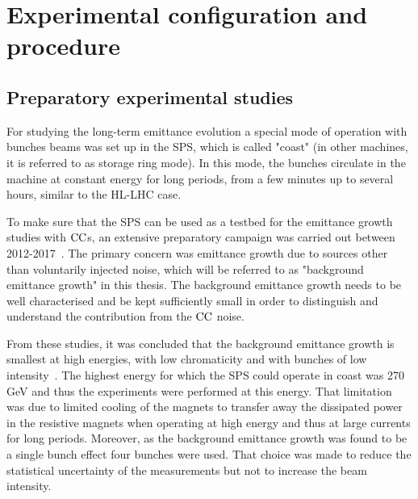 \section{Experimental configuration and procedure}\label{sec:exp_setup_2018}

\subsection{Preparatory experimental studies}\label{sec:preparatory_studies_for_2018_MD}
For studying the long-term emittance evolution a special mode of operation with bunches beams was set up in the SPS, which is called "coast" (in other machines, it is referred to as storage ring mode). In this mode, the bunches circulate in the machine at constant energy for long periods, from a few minutes up to several hours, similar to the HL-LHC case.\setlength{\parskip}{2ex} %

To make sure that the SPS can be used as a testbed for the emittance growth studies with ${\mathrm{CC}}$s, an extensive preparatory campaign was carried out between 2012-2017~\cite{Calaga:1451286, Alekou_CC_coast_prep_2016, Antoniou:2649815}. The primary concern was emittance growth due to sources other than voluntarily injected noise, which will be referred to as "background emittance growth" in this thesis. The background emittance growth needs to be well characterised and be kept sufficiently small in order to distinguish and understand the contribution from the ${\mathrm{CC}}$ noise. 

From these studies, it was concluded that the background emittance growth is smallest at high energies, with low chromaticity and with bunches of low intensity~\cite{Antoniou:2649815}. The highest energy for which the SPS could operate in coast was 270\,GeV and thus the experiments were performed at this energy.  That limitation was due to limited cooling of the magnets to transfer away the dissipated power in the resistive magnets when operating at high energy and thus at large currents for long periods. %
Moreover, as the background emittance growth was found to be a single bunch effect four bunches were used. That choice was made to reduce the statistical uncertainty of the measurements but not to increase the beam intensity.

